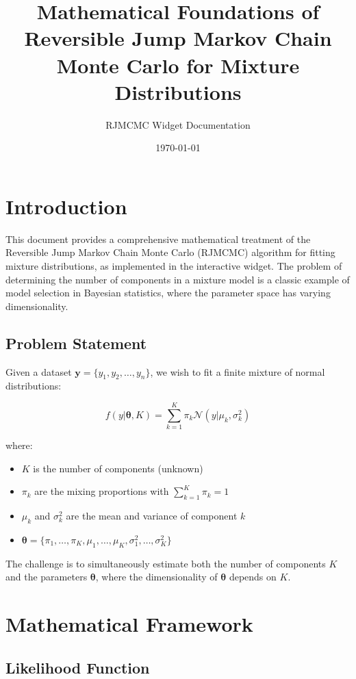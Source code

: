 \documentclass[12pt]{article}
\title{Mathematical Foundations of Reversible Jump Markov Chain Monte Carlo for Mixture Distributions}
\author{RJMCMC Widget Documentation}
\date{\today}
\begin{document}
\maketitle

\section{Introduction}

This document provides a comprehensive mathematical treatment of the Reversible Jump Markov Chain Monte Carlo (RJMCMC) algorithm for fitting mixture distributions, as implemented in the interactive widget. The problem of determining the number of components in a mixture model is a classic example of model selection in Bayesian statistics, where the parameter space has varying dimensionality.

\subsection{Problem Statement}

Given a dataset $\mathbf{y} = \{y_1, y_2, \ldots, y_n\}$, we wish to fit a finite mixture of normal distributions:

\begin{equation}
f(y|\boldsymbol{\theta}, K) = \sum_{k=1}^{K} \pi_k \mathcal{N}(y|\mu_k, \sigma_k^2)
\end{equation}

where:
\begin{itemize}
\item $K$ is the number of components (unknown)
\item $\pi_k$ are the mixing proportions with $\sum_{k=1}^K \pi_k = 1$
\item $\mu_k$ and $\sigma_k^2$ are the mean and variance of component $k$
\item $\boldsymbol{\theta} = \{\pi_1, \ldots, \pi_K, \mu_1, \ldots, \mu_K, \sigma_1^2, \ldots, \sigma_K^2\}$
\end{itemize}

The challenge is to simultaneously estimate both the number of components $K$ and the parameters $\boldsymbol{\theta}$, where the dimensionality of $\boldsymbol{\theta}$ depends on $K$.

\section{Mathematical Framework}

\subsection{Likelihood Function}
\end{document}
